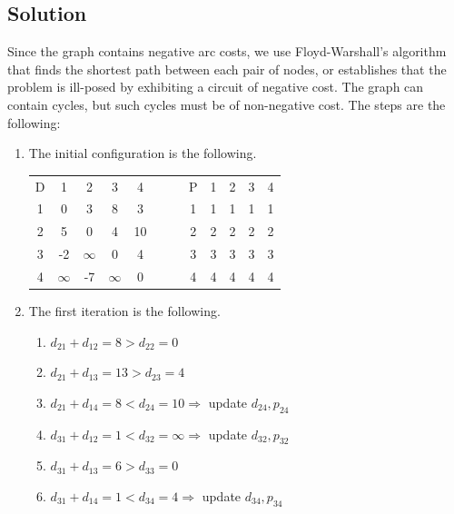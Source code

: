 \documentclass[12pt, a4paper]{report}
\begin{document}
    \subsection*{Solution}
        Since the graph contains negative arc costs, we use Floyd-Warshall's algorithm that finds the shortest path between each pair of nodes, or establishes that the 
        problem is ill-posed by exhibiting a circuit of negative cost. The graph can contain cycles, but such cycles must be of non-negative cost. The steps are the following: 
        \begin{enumerate}
            \item The initial configuration is the following. 
                \begin{table}[H]
                    \centering
                    \begin{tabular}{c|cccccc|cccc}
                    D & 1        & 2        & 3        & 4  & $\:\:\:\:\:\:$ & P & 1 & 2 & 3 & 4 \\ \cline{1-5} \cline{7-11} 
                    1 & 0        & 3        & 8        & 3  &                & 1 & 1 & 1 & 1 & 1 \\
                    2 & 5        & 0        & 4        & 10 &                & 2 & 2 & 2 & 2 & 2 \\
                    3 & -2       & $\infty$ & 0        & 4  &                & 3 & 3 & 3 & 3 & 3 \\
                    4 & $\infty$ & -7       & $\infty$ & 0  &                & 4 & 4 & 4 & 4 & 4
                    \end{tabular}
                \end{table}
            \item The first iteration is the following. 
                \begin{enumerate}
                    \item $d_{21} + d_{12} = 8 > d_{22} = 0$
                    \item $d_{21} + d_{13} = 13 > d_{23} = 4$
                    \item $d_{21} + d_{14} = 8 < d_{24} = 10 \Rightarrow$ update $d_{24}, p_{24}$
                    \item $d_{31} + d_{12} = 1 < d_{32} = \infty \Rightarrow$ update $d_{32}, p_{32}$
                    \item $d_{31} + d_{13} = 6 > d_{33} = 0$
                    \item $d_{31} + d_{14} = 1 < d_{34} = 4 \Rightarrow$ update $d_{34}, p_{34}$

\end{enumerate}
\end{enumerate}
\end{document}
